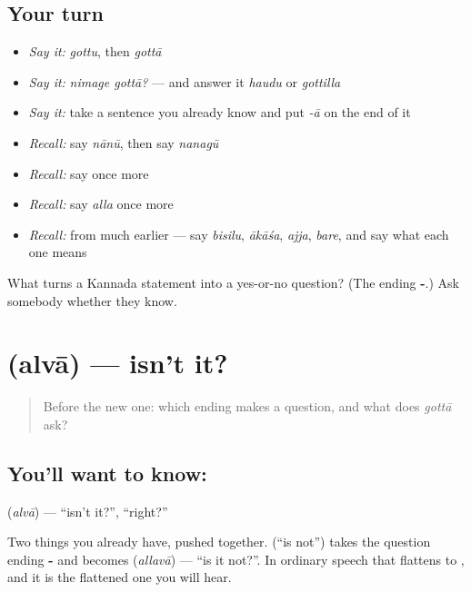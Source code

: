 \subsection*{Your turn}
\begin{itemize}
\raggedright
  \item \emph{Say it:} \emph{gottu}, then \emph{gottā}
  \item \emph{Say it:} \emph{nimage gottā?} — and answer it \emph{haudu} or \emph{gottilla}
  \item \emph{Say it:} take a sentence you already know and put \emph{-ā} on the end of it
  \item \emph{Recall:} say \emph{nānū}, then say \emph{nanagū}
  \item \emph{Recall:} say \emph{} once more
  \item \emph{Recall:} say \emph{alla} once more
  \item \emph{Recall:} from much earlier — say \emph{bisilu}, \emph{ākāśa}, \emph{ajja}, \emph{bare}, and say what each one means
\end{itemize}

\begin{tcolorbox}[breakable,colback=teal!4,colframe=teal!35!black,title={Before you move on}]
What turns a Kannada statement into a yes-or-no question? (The ending \textbf{-}.) Ask somebody whether they know.
\end{tcolorbox}
\section[\texorpdfstring{\kn{ಅಲ್ವಾ} (alvā)}{ಅಲ್ವಾ (alvā)}]{ (alvā) — isn't it?}

\label{lesson:KA-C69-isnt-it}



\begin{quote}
Before the new one: which ending makes a question, and what does \emph{gottā} ask?
\end{quote}

\subsection*{You'll want to know: }
\textbf{} (\emph{alvā}) — \textquotedblleft{}isn't it?\textquotedblright{}, \textquotedblleft{}right?\textquotedblright{}

Two things you already have, pushed together.  (\textquotedblleft{}is not\textquotedblright{}) takes the question ending \textbf{-} and becomes  (\emph{allavā}) — \textquotedblleft{}is it not?\textquotedblright{}. In ordinary speech that flattens to \textbf{}, and it is the flattened one you will hear.


